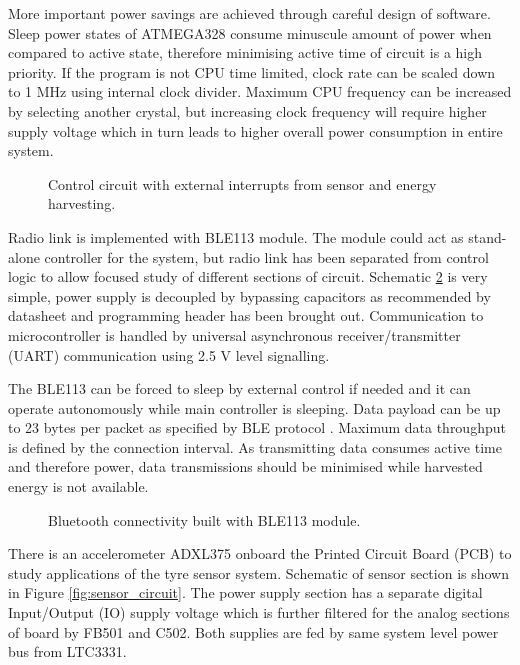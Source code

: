 More important power savings are achieved through careful design of software. Sleep power states of ATMEGA328 consume minuscule amount of power when compared to active state, therefore minimising active time of circuit is a high priority. If the program is not CPU time limited, clock rate can be scaled down to 1 MHz using internal clock divider. Maximum CPU frequency can be increased by selecting another crystal, but increasing clock frequency will require higher supply voltage which in turn leads to higher overall power consumption in entire system.

\begin{figure}
    \centering
    \def\svgwidth{\columnwidth}
    
    \caption{\label{fig:atmega_circuit} Control circuit with external interrupts from sensor and energy harvesting.}
\end{figure}

Radio link is implemented with BLE113 module. The module could act as stand-alone controller for the system, but radio link has been separated from control logic to allow focused study of different sections of circuit.  Schematic  \ref{fig:bluetooth_circuit} is very simple, power supply is decoupled by bypassing capacitors as recommended by datasheet and programming header has been brought out. Communication to microcontroller is handled by universal asynchronous receiver/transmitter (UART) communication using 2.5 V level signalling. 

The BLE113 can be forced to sleep by external control if needed and it can operate autonomously while main controller is sleeping. Data payload can be up to 23 bytes per packet as specified by BLE protocol \cite{Gomez2012}. Maximum data throughput is defined by the connection interval. As transmitting data consumes active time and therefore power, data transmissions should be minimised while harvested energy is not available.

\begin{figure}
    \centering
    \def\svgwidth{\columnwidth}
    
    \caption{\label{fig:bluetooth_circuit} Bluetooth connectivity built with BLE113 module.}
\end{figure}

There is an accelerometer ADXL375 onboard the Printed Circuit Board (PCB) to study applications of the tyre sensor system. Schematic of sensor section is shown in Figure \ref{fig:sensor_circuit}. The power supply section has a separate digital Input/Output (IO) supply voltage which is further filtered for the analog sections of board by FB501 and C502. Both supplies are fed by same system level power bus from LTC3331.

